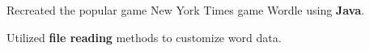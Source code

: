\documentclass[letterpaper,10pt]{article}
\begin{document}
\vspace{0pt}
\begin{resume_list}
  \item Recreated the popular game New York Times game Wordle using \textbf{Java}.
  \vspace{1pt}
  \item Utilized \textbf{file reading} methods to customize word data.
\end{resume_list}
\end{document}
